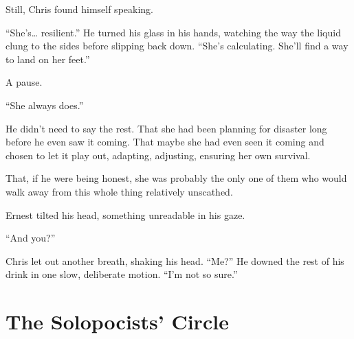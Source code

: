 Still, Chris found himself speaking.  

“She’s… resilient.” He turned his glass in his hands, watching the way the liquid clung to the sides before slipping back down. “She’s calculating. She’ll find a way to land on her feet.”  

A pause.  

“She always does.” 

He didn’t need to say the rest. That she had been planning for disaster long before he even saw it coming. That maybe she had even seen it coming and chosen to let it play out, adapting, adjusting, ensuring her own survival.  

That, if he were being honest, she was probably the only one of them who would walk away from this whole thing relatively unscathed.  

Ernest tilted his head, something unreadable in his gaze.  

“And you?” 

Chris let out another breath, shaking his head. “Me?” He downed the rest of his drink in one slow, deliberate motion.  “I’m not so sure.”

\newpage
\section*{The Solopocists' Circle}

